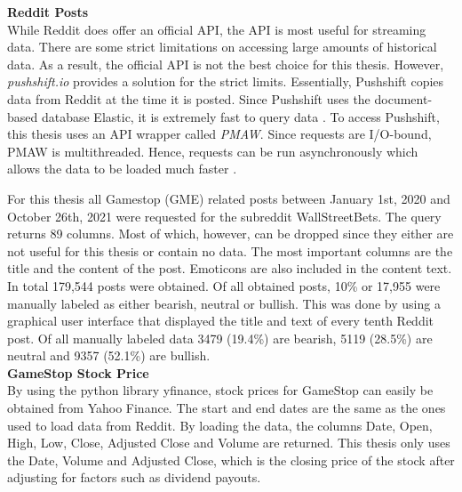 \documentclass[11pt, a4paper]{article}
\begin{document}
\noindent\textbf{Reddit Posts}\\
While Reddit does offer an official API, the API is most useful for streaming data. 
There are some strict limitations on accessing large amounts of historical data. As a result, the official API is not the best choice for this thesis. 
However, \emph{pushshift.io} provides a solution for the strict limits. Essentially, Pushshift copies data from Reddit at the time it is posted. Since Pushshift uses the document-based database Elastic, it is extremely fast to query data \citep{elastic2015}.
To access Pushshift, this thesis uses an API wrapper called \emph{PMAW}. Since requests are I/O-bound, PMAW is multithreaded. Hence, requests can be run asynchronously which allows the data to be loaded much faster \citep{pmaw2021}.

For this thesis all Gamestop (GME) related posts between January 1st, 2020 and October 26th, 2021 were requested for the subreddit WallStreetBets. 
The query returns 89 columns. Most of which, however, can be dropped since they either are not useful for this thesis or contain no data. 
The most important columns are the title and the content of the post. 
Emoticons are also included in the content text. In total 179,544 posts were obtained. Of all obtained posts, 10\% or 17,955 were manually labeled as either bearish, neutral or bullish. This was done by using a graphical user interface that displayed the title and
text of every tenth Reddit post. Of all manually labeled data 3479 (19.4\%) are bearish, 5119 (28.5\%) are neutral and 9357 (52.1\%) are bullish. \\

\noindent\textbf{GameStop Stock Price}\\
By using the python library yfinance, stock prices for GameStop can easily be obtained from Yahoo Finance. The start and end dates are the same as the ones used to load data from Reddit.
By loading the data, the columns Date, Open, High, Low, Close, Adjusted Close and Volume are returned. This thesis only uses the Date, Volume and Adjusted Close, which is the closing price
of the stock after adjusting for factors such as dividend payouts.
\end{document}
